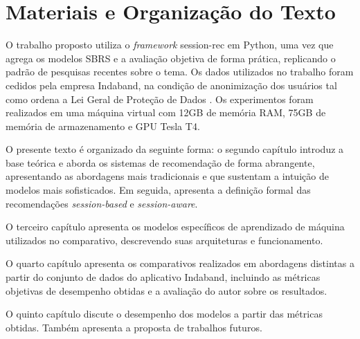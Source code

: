 \section{Materiais e Organização do Texto}

O trabalho proposto utiliza o \textit{framework} session-rec \cite{sessionrec}
em Python, uma vez que agrega os modelos SBRS e a avaliação objetiva de forma
prática, replicando o padrão de pesquisas recentes sobre o tema. Os dados
utilizados no trabalho foram cedidos pela empresa Indaband, na condição de
anonimização dos usuários tal como ordena a Lei Geral de Proteção de
Dados \cite{lgpd}. Os experimentos foram realizados em uma máquina virtual com
12GB de memória RAM, 75GB de memória de armazenamento e GPU Tesla T4.

O presente texto é organizado da seguinte forma: o segundo capítulo introduz a
base teórica e aborda os sistemas de recomendação de forma abrangente,
apresentando as abordagens mais tradicionais e que sustentam a intuição de
modelos mais sofisticados. Em seguida, apresenta a definição formal das
recomendações \textit{session-based} e \textit{session-aware}.

O terceiro capítulo apresenta os modelos específicos de aprendizado de máquina
utilizados no comparativo, descrevendo suas arquiteturas e funcionamento.

O quarto capítulo apresenta os comparativos realizados em abordagens distintas a
partir do conjunto de dados do aplicativo Indaband, incluindo as métricas
objetivas de desempenho obtidas e a avaliação do autor sobre os resultados.

O quinto capítulo discute o desempenho dos modelos a partir das métricas
obtidas. Também apresenta a proposta de trabalhos futuros.